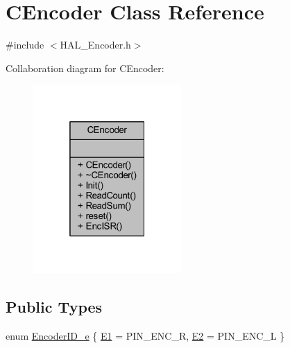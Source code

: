 \hypertarget{class_c_encoder}{}\section{C\+Encoder Class Reference}
\label{class_c_encoder}


{\ttfamily \#include $<$H\+A\+L\+\_\+\+Encoder.\+h$>$}



Collaboration diagram for C\+Encoder\+:
\nopagebreak
\begin{figure}[H]
\begin{center}
\leavevmode
\includegraphics[width=160pt]{class_c_encoder__coll__graph}
\end{center}
\end{figure}
\subsection*{Public Types}
\begin{DoxyCompactItemize}
\item 
enum \mbox{\hyperlink{class_c_encoder_a49810cc352199fb02a60e2ef8ac6cbc3}{Encoder\+I\+D\+\_\+e}} \{ \mbox{\hyperlink{class_c_encoder_a49810cc352199fb02a60e2ef8ac6cbc3a8f0ceb6874e0c79b53bf26fa42a1b652}{E1}} = P\+I\+N\+\_\+\+E\+N\+C\+\_\+R, 
\mbox{\hyperlink{class_c_encoder_a49810cc352199fb02a60e2ef8ac6cbc3aaa314a69656e242defabd33eb8e90284}{E2}} = P\+I\+N\+\_\+\+E\+N\+C\+\_\+L
 \}
\end{DoxyCompactItemize}
